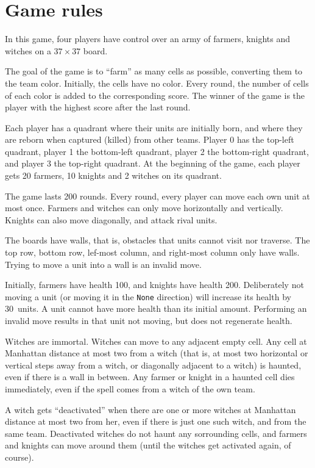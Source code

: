 
\section{Game rules}

\medskip In this game, four players have control over an army of
farmers, knights and witches on a $37 \times 37$ board.

\medskip The goal of the game is to ``farm'' as many cells as possible,
converting them to the team color. Initially, the cells have no color.
Every round, the number of cells of each color is added to the
corresponding score. The winner of the game is the player with the
highest score after the last round.

\medskip Each player has a quadrant where their units are initially
born, and where they are reborn when captured (killed) from other
teams. Player 0 has the top-left quadrant, player 1 the bottom-left
quadrant, player 2 the bottom-right \mbox{quadrant}, and player 3 the
top-right quadrant. At the beginning of the game, each player gets 20
farmers, 10 knights and 2 witches on its quadrant.

\medskip The game lasts 200 rounds. Every round, every player can move
each own unit at most once. Farmers  and witches can only move
horizontally and vertically. Knights can also move diagonally, and
attack rival units.

\medskip The boards have walls, that is, obstacles that units cannot
visit nor traverse. The top row, bottom row, lef-most column, and
right-most column only have walls. Trying to move a unit into a wall is
an invalid move.

\medskip Initially, farmers have health 100, and knights have health
200. Deliberately not moving a unit (or moving it in the \texttt{None}
direction) will increase its health by 30~units. A unit cannot have
more health than its initial amount. Performing an invalid move results
in that unit not moving, but does not regenerate health.

\medskip Witches are immortal. Witches can move to any adjacent empty
cell. Any cell at Manhattan distance at most two from a witch (that is,
at most two horizontal or vertical steps away from a witch, or
diagonally adjacent to a witch) is haunted, even if there is a wall in between.
Any farmer or knight in a
haunted cell dies immediately, even if the spell comes from a witch of
the own team.

\medskip A witch gets ``deactivated'' when there are one or more
witches at Manhattan distance at most two from her, even if there is
just one such witch, and from the same team. Deactivated witches do not
haunt any sorrounding cells, and farmers and knights can move around
them (until the witches get activated again, of course).

